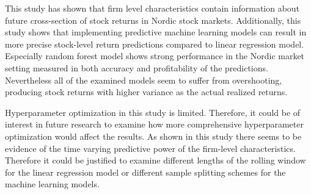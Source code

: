 \documentclass[12pt]{article}
\begin{document}
This study has shown that firm level characteristics contain information about future cross-section of stock returns in Nordic stock markets. Additionally, this study shows that implementing predictive machine learning models can result in more precise stock-level return predictions compared to linear regression model. Especially random forest model shows strong performance in the Nordic market setting measured in both accuracy and profitability of the predictions. Nevertheless all of the examined models seem to suffer from overshooting, producing stock returns with higher variance as the actual realized returns. \par

Hyperparameter optimization in this study is limited. Therefore, it could be of interest in future research to examine how more comprehensive hyperparameter optimization would affect the results. As shown in this study there seems to be evidence of the time varying predictive power of the firm-level characteristics. Therefore it could be justified to examine different lengths of the rolling window for the linear regression model or different sample splitting schemes for the machine learning models.

\clearpage
\end{document}
